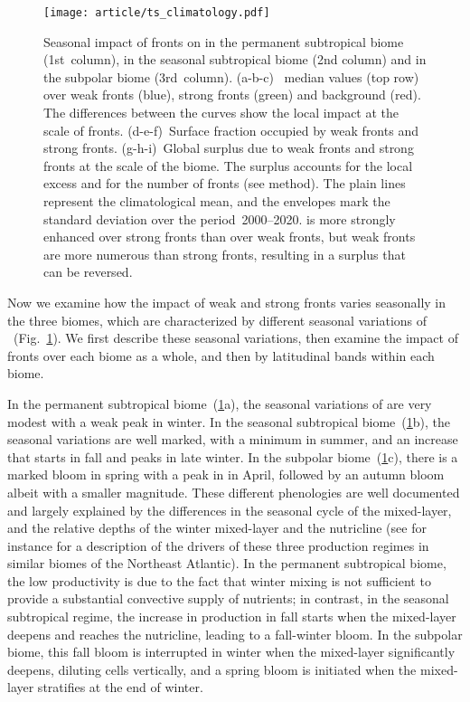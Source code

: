 \begin{figure}
  \centering
  \texttt{[image: article/ts\_climatology.pdf]}
  \caption[Seasonal impact of fronts on ]{
    Seasonal impact of fronts on  in the permanent subtropical biome (1st~column), in the seasonal subtropical biome (2nd column) and in the subpolar biome (3rd~column).
    (a-b-c)~ median values (top row) over weak fronts (blue), strong fronts (green) and background (red).
    The differences between the curves show the local impact at the scale of fronts.
    (d-e-f)~Surface fraction occupied by weak fronts and strong fronts.
    (g-h-i)~Global  surplus due to weak fronts and strong fronts at the scale of the biome.
    The surplus accounts for the local excess and for the number of fronts (see method).
    The plain lines represent the climatological mean, and the envelopes mark the standard deviation over the period~2000--2020.
     is more strongly enhanced over strong fronts than over weak fronts, but weak fronts are more numerous than strong fronts, resulting in a  surplus that can be reversed.
  }%
  \label{fig:ts-climato}
\end{figure}

Now we examine how the impact of weak and strong fronts varies seasonally in the three biomes, which are characterized by different seasonal variations of ~(Fig.~\ref{fig:ts-climato}).
We first describe these seasonal variations, then examine the impact of fronts over each biome as a whole, and then by latitudinal bands within each biome.

In the permanent subtropical biome~(\cref{fig:ts-climato}a), the seasonal variations of  are very modest with a weak peak in winter.
In the seasonal subtropical biome~(\cref{fig:ts-climato}b), the seasonal variations are well marked, with a minimum in summer, and an increase that starts in fall and peaks in late winter.
In the subpolar biome~(\cref{fig:ts-climato}c), there is a marked bloom in spring with a peak in  in April, followed by an autumn bloom albeit with a smaller magnitude.
These different phenologies are well documented and largely explained by the differences in the seasonal cycle of the mixed-layer, and the relative depths of the winter mixed-layer and the nutricline (see for instance \textcite{levy_2005a} for a description of the drivers of these three production regimes in similar biomes of the Northeast Atlantic).
In the permanent subtropical biome, the low productivity is due to the fact that winter mixing is not sufficient to provide a substantial convective supply of nutrients; in contrast, in the seasonal subtropical regime, the increase in production in fall starts when the mixed-layer deepens and reaches the nutricline, leading to a fall-winter bloom.
In the subpolar biome, this fall bloom is interrupted in winter when the mixed-layer significantly deepens, diluting cells vertically, and a spring bloom is initiated when the mixed-layer stratifies at the end of winter.

